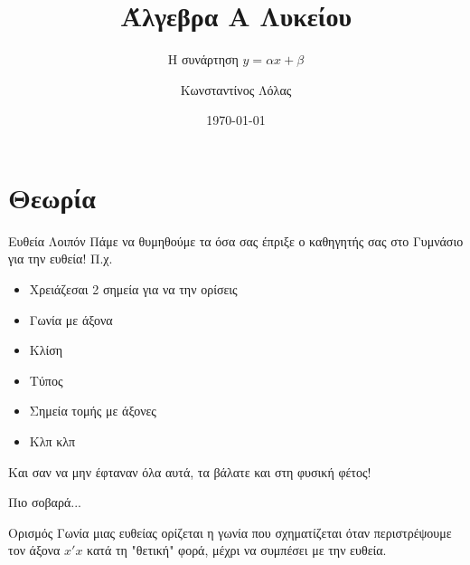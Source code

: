 \documentclass{presentation}
\title{Άλγεβρα Α Λυκείου}
\subtitle{Η συνάρτηση $y=αx+β$}
\author[Λόλας]{Κωνσταντίνος Λόλας}
\date{\today}
\begin{document}
\frame{\titlepage}

\section{Θεωρία}

\begin{frame}{Ευθεία Λοιπόν}
  Πάμε να θυμηθούμε τα όσα σας έπριξε ο καθηγητής σας στο Γυμνάσιο για την ευθεία! Π.χ.
  \begin{itemize}
    \item Χρειάζεσαι 2 σημεία για να την ορίσεις
    \item Γωνία με άξονα
    \item Κλίση
    \item Τύπος
    \item Σημεία τομής με άξονες
    \item Κλπ κλπ
  \end{itemize}
  Και σαν να μην έφταναν όλα αυτά, τα βάλατε και στη φυσική φέτος!
\end{frame}

\begin{frame}{Πιο σοβαρά...}
  \begin{block}{Ορισμός}
    Γωνία μιας ευθείας ορίζεται η γωνία που σχηματίζεται όταν περιστρέψουμε τον άξονα $x'x$ κατά τη "θετική" φορά, μέχρι να συμπέσει με την ευθεία.
  \end{block}
\end{frame}
\end{document}
